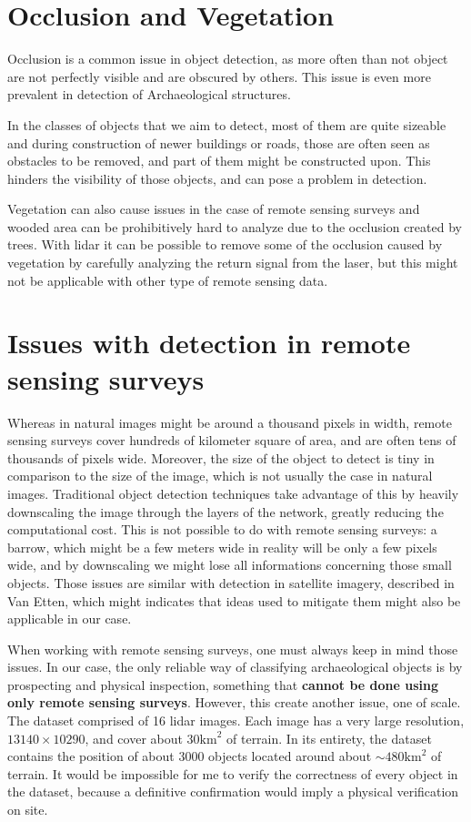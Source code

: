 \section{Occlusion and Vegetation}
Occlusion is a common issue in object detection, as more often than not object are not perfectly visible and are obscured by others. This issue is even more prevalent in detection of Archaeological structures. 

In the classes of objects that we aim to detect, most of them are quite sizeable and during construction of newer buildings or roads, those are often seen as obstacles to be removed, and part of them might be constructed upon. This hinders the visibility of those objects, and can pose a problem in detection.

Vegetation can also cause issues in the case of remote sensing surveys and wooded area can be prohibitively hard to analyze due to the occlusion created by trees\cite{kenzlerLambers2015}. With \gls{lidar} it can be possible to remove some of the occlusion caused by vegetation by carefully analyzing the return signal from the laser, but this might not be applicable with other type of remote sensing data.

\section{Issues with detection in remote sensing surveys}%
Whereas in natural images might be around a thousand pixels in width, remote sensing surveys cover hundreds of kilometer square of area, and are often tens of thousands of pixels wide. Moreover, the size of the object to detect is tiny in comparison to the size of the image, which is not usually the case in natural images. Traditional object detection techniques take advantage of this by heavily downscaling the image through the layers of the network, greatly reducing the computational cost. This is not possible to do with remote sensing surveys: a barrow, which might be a few meters wide in reality will be only a few pixels wide, and by downscaling we might lose all informations concerning those small objects. Those issues are similar with detection in satellite imagery, described in Van Etten\cite{yolt}, which might indicates that ideas used to mitigate them might also be applicable in our case.

When working with remote sensing surveys, one must always keep in mind those issues. In our case, the only reliable way of classifying archaeological objects is by prospecting and physical inspection, something that \textbf{cannot be done using only remote sensing surveys}. However, this create another issue, one of scale. The dataset comprised of 16 \gls{lidar} images. Each image has a very large resolution, $13140 \times 10290$, and cover about $30\text{km}^2$ of terrain. In its entirety, the dataset contains the position of about 3000 objects located around about $\sim 480\text{km}^2$ of terrain. It would be impossible for me to verify the correctness of every object in the dataset, because a definitive confirmation would imply a physical verification on site.

